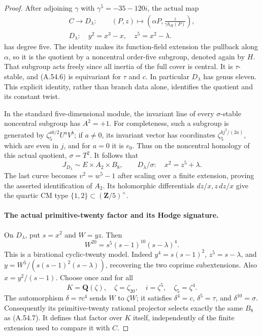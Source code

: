 \begin{proof}
After adjoining \(\gamma\) with \(\gamma^5=-35-120i\),
the actual map
\[
 \begin{gathered}
 C\longrightarrow D_\lambda:\qquad
 (P,z)\longmapsto\left(\alpha P,\frac{z}{\gamma h_H(P)}\right),
 \\
 D_\lambda:\quad y^2=x^3-x,\quad z^5=x^2-\lambda.
 \end{gathered}
                                                               \tag{A.54.6}
\]
has degree five. The identity makes its function-field extension
the pullback along \(\alpha\), so it is the quotient by a
noncentral order-five subgroup, denoted again by \(H\).
That subgroup acts freely since all inertia of the full cover is
central. It is \(\tau\)-stable, and (A.54.6) is equivariant
for \(\tau\) and \(c\). In particular \(D_\lambda\) has
genus eleven. This explicit identity, rather than branch data alone,
identifies the quotient and its constant twist.

In the standard five-dimensional module, the invariant line of
every \(\sigma\)-stable noncentral subgroup has \(A^2=+1\).
For completeness, such a subgroup is generated by
\(\zeta _5^{ab/2}U^aV^b\); if \(a\ne0\), its invariant
vector has coordinates \(\zeta _5^{bj^2/(2a)}\), which are
even in \(j\), and for \(a=0\) it is \(e_0\).
Thus on the noncentral homology of this actual quotient,
\(\sigma=T^2\). It follows that
\[
 J_{D_\lambda}\sim E\times A_2\times B_8,\qquad
 D_\lambda/\sigma:\quad x^2=z^5+\lambda.             \tag{A.54.7}
\]
The last curve becomes \(v^2=w^5-1\) after scaling over
a finite extension, proving the asserted identification of \(A_2\).
Its holomorphic differentials \(dz/x,z\,dz/x\) give the
quartic CM type \(\{1,2\}\subset(\mathbf Z/5)^\times\).

\paragraph{The actual primitive-twenty factor and its Hodge signature.}
On \(D_\lambda\), put \(s=x^2\) and \(W=yz\). Then
\[
 W^{20}=s^5(s-1)^{10}(s-\lambda)^4.                 \tag{A.54.8}
\]
This is a birational cyclic-twenty model. Indeed
\(y^4=s(s-1)^2\), \(z^5=s-\lambda\), and
\(y=W^5/(s(s-1)^2(s-\lambda))\), recovering the two
coprime subextensions. Also \(x=y^2/(s-1)\).
Choose once and for all
\[
 K=\mathbf Q(\zeta),\quad \zeta=\zeta_{20},
 \quad i=\zeta^5,\quad \zeta_5=\zeta^4.
\]
The automorphism \(\delta=\tau c^4\) sends \(W\) to
\(\zeta W\); it satisfies \(\delta^4=c\),
\(\delta^5=\tau\), and \(\delta^{10}=\sigma\).
Consequently its primitive-twenty rational projector selects
exactly the same \(B_8\) as (A.54.7). It defines that factor
over \(K\) itself, independently of the finite extension used
to compare it with \(C\).


\end{proof}
